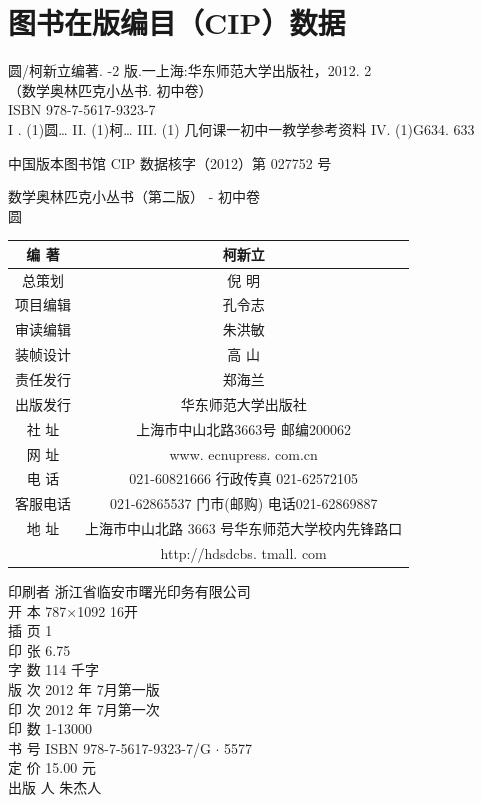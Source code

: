 \documentclass[10pt]{article}
\begin{document}
\section*{图书在版编目（CIP）数据}
圆/柯新立编著. -2 版.一上海:华东师范大学出版社，2012. 2\\
（数学奥林匹克小丛书. 初中卷）\\
ISBN 978-7-5617-9323-7\\
I . (1)圆… II. (1)柯… III. (1) 几何课一初中一教学参考资料 IV. (1)G634. 633

中国版本图书馆 CIP 数据核字（2012）第 027752 号

数学奥林匹克小丛书（第二版） - 初中卷\\
圆

\begin{center}
\begin{tabular}{|c|c|}
\hline
编 著 & 柯新立 \\
\hline
总策划 & 倪 明 \\
\hline
项目编辑 & 孔令志 \\
\hline
审读编辑 & 朱洪敏 \\
\hline
装帧设计 & 高 山 \\
\hline
责任发行 & 郑海兰 \\
\hline
出版发行 & 华东师范大学出版社 \\
\hline
社 址 & 上海市中山北路3663号 邮编200062 \\
\hline
网 址 & www. ecnupress. com.cn \\
\hline
电 话 & 021-60821666 行政传真 021-62572105 \\
\hline
客服电话 & 021-62865537 门市(邮购) 电话021-62869887 \\
\hline
地 址 & 上海市中山北路 3663 号华东师范大学校内先锋路口 \\
\hline
 & http://hdsdcbs. tmall. com \\
\hline
\end{tabular}
\end{center}

印刷者 浙江省临安市曙光印务有限公司\\
开 本 787×1092 16开\\
插 页 1\\
印 张 6.75\\
字 数 114 千字\\
版 次 2012 年 7月第一版\\
印 次 2012 年 7月第一次\\
印 数 1-13000\\
书 号 ISBN 978-7-5617-9323-7/G $\cdot$ 5577\\
定 价 15.00 元\\
出版 人 朱杰人
\end{document}

